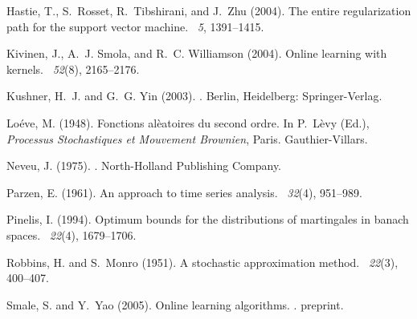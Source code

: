 \documentclass[twoside,11pt]{amsart}
\theoremstyle{theorem}
\theoremstyle{definition}
\theoremstyle{remark}
\begin{document}
\begin{thebibliography}{}
{\sc Hastie, T.}, {\sc S.~Rosset}, {\sc R.~Tibshirani}, and {\sc J.~Zhu}
  (2004).
\newblock The entire regularization path for the support vector machine.
~{\em 5}, 1391--1415.

{\sc Kivinen, J.}, {\sc A.~J. Smola}, and {\sc R.~C. Williamson} (2004).
\newblock Online learning with kernels.
~{\em 52\/}(8),
  2165--2176.

{\sc Kushner, H.~J.} and {\sc G.~G. Yin} (2003).
.
\newblock Berlin, Heidelberg: Springer-Verlag.

{\sc Lo\'{e}ve, M.} (1948).
\newblock Fonctions al\`{e}atoires du second ordre.
\newblock In P.~L\`{e}vy (Ed.), {\em Processus Stochastiques et Mouvement
  Brownien}, Paris. Gauthier-Villars.

{\sc Neveu, J.} (1975).
.
\newblock North-Holland Publishing Company.

{\sc Parzen, E.} (1961).
\newblock An approach to time series analysis.
~{\em 32\/}(4),
  951--989.

{\sc Pinelis, I.} (1994).
\newblock Optimum bounds for the distributions of martingales in banach spaces.
~{\em 22\/}(4), 1679--1706.

{\sc Robbins, H.} and {\sc S.~Monro} (1951).
\newblock A stochastic approximation method.
~{\em 22\/}(3),
  400--407.

{\sc Smale, S.} and {\sc Y.~Yao} (2005).
\newblock Online learning algorithms.
.
\newblock preprint.


\end{thebibliography}
\end{document}
